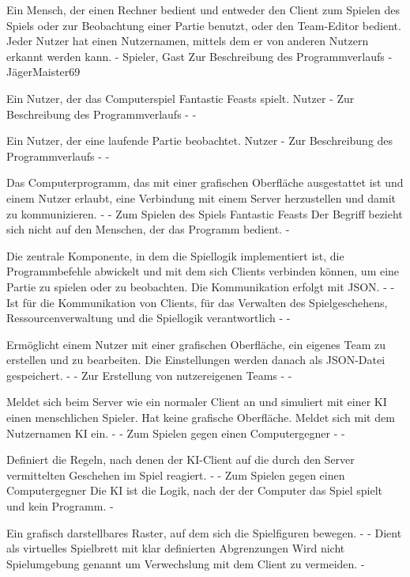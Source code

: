 {Ein Mensch, der einen Rechner bedient und entweder den Client zum Spielen des Spiels oder zur Beobachtung einer Partie benutzt, oder den Team-Editor bedient. Jeder Nutzer hat einen Nutzernamen, mittels dem er von anderen Nutzern erkannt werden kann.}
{-}
{Spieler, Gast}
{Zur Beschreibung des Programmverlaufs}
{-}
{JägerMaister69}

{Ein Nutzer, der das Computerspiel \glqq{}Fantastic Feasts\grqq{}  spielt.}
{Nutzer}
{-}
{Zur Beschreibung des Programmverlaufs}
{-}
{-}

{Ein Nutzer, der eine laufende Partie beobachtet.}
{Nutzer}
{-}
{Zur Beschreibung des Programmverlaufs}
{-}
{-}

{Das Computerprogramm, das mit einer grafischen Oberfläche ausgestattet ist und einem Nutzer erlaubt, eine Verbindung mit einem Server herzustellen und damit zu kommunizieren.}
{-}
{-}
{Zum Spielen des Spiels \glqq{}Fantastic Feasts\grqq{}}
{Der Begriff bezieht sich nicht auf den Menschen, der das Programm bedient.}
{-}

{Die zentrale Komponente, in dem die Spiellogik implementiert ist, die Programmbefehle abwickelt und mit dem sich Clients verbinden können, um eine Partie zu spielen oder zu beobachten. Die Kommunikation erfolgt mit JSON.}
{-}
{-}
{Ist für die Kommunikation von Clients, für das Verwalten des Spielgeschehens, Ressourcenverwaltung und die Spiellogik verantwortlich}
{-}
{-}

{Ermöglicht einem Nutzer mit einer grafischen Oberfläche, ein eigenes Team zu erstellen und zu bearbeiten. Die Einstellungen werden danach als JSON-Datei gespeichert.}
{-}
{-}
{Zur Erstellung von nutzereigenen Teams}
{-}
{-}

{Meldet sich beim Server wie ein normaler Client an und simuliert mit einer KI einen menschlichen Spieler. Hat keine grafische Oberfläche. Meldet sich mit dem Nutzernamen \glqq{}KI\grqq{}  ein.}
{-}
{-}
{Zum Spielen gegen einen Computergegner}
{-}
{-}

{Definiert die Regeln, nach denen der KI-Client auf die durch den Server vermittelten Geschehen im Spiel reagiert.}
{-}
{-}
{Zum Spielen gegen einen Computergegner}
{Die KI ist die Logik, nach der der Computer das Spiel spielt und kein Programm.}
{-}

{Ein grafisch darstellbares Raster, auf dem sich die Spielfiguren bewegen.}
{-}
{-}
{Dient als virtuelles Spielbrett mit klar definierten Abgrenzungen}
{Wird nicht Spielumgebung genannt um Verwechslung mit dem Client zu vermeiden.}
{-}

